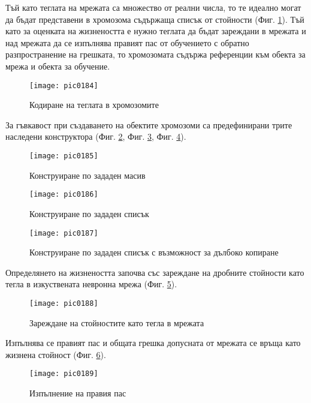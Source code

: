 Тъй като теглата на мрежата са множество от реални числа, то те идеално могат да бъдат представени в хромозома съдържаща списък от стойности (Фиг. \ref{fig:pic0184}). Тъй като за оценката на жизнеността е нужно теглата да бъдат зареждани в мрежата и над мрежата да се изпълнява правият пас от обучението с обратно разпространение на грешката, то хромозомата съдържа референции към обекта за мрежа и обекта за обучение. 

\begin{figure}[h]
  \centering
  \texttt{[image: pic0184]}
  \caption{Кодиране на теглата в хромозомите}
\label{fig:pic0184}
\end{figure}
\FloatBarrier

За гъвкавост при създаването на обектите хромозоми са предефинирани трите наследени конструктора (Фиг. \ref{fig:pic0185}, Фиг. \ref{fig:pic0186}, Фиг. \ref{fig:pic0187}).

\begin{figure}[h]
  \centering
  \texttt{[image: pic0185]}
  \caption{Конструиране по зададен масив}
\label{fig:pic0185}
\end{figure}
\FloatBarrier

\begin{figure}[h]
  \centering
  \texttt{[image: pic0186]}
  \caption{Конструиране по зададен списък}
\label{fig:pic0186}
\end{figure}
\FloatBarrier

\begin{figure}[h]
  \centering
  \texttt{[image: pic0187]}
  \caption{Конструиране по зададен списък с възможност за дълбоко копиране}
\label{fig:pic0187}
\end{figure}
\FloatBarrier

Определянето на жизнеността започва със зареждане на дробните стойности като тегла в изкуствената невронна мрежа (Фиг. \ref{fig:pic0188}).

\begin{figure}[h]
  \centering
  \texttt{[image: pic0188]}
  \caption{Зареждане на стойностите като тегла в мрежата}
\label{fig:pic0188}
\end{figure}
\FloatBarrier

Изпълнява се правият пас и общата грешка допусната от мрежата се връща като жизнена стойност (Фиг. \ref{fig:pic0189}).

\begin{figure}[h]
  \centering
  \texttt{[image: pic0189]}
  \caption{Изпълнение на правия пас}
\label{fig:pic0189}
\end{figure}
\FloatBarrier

